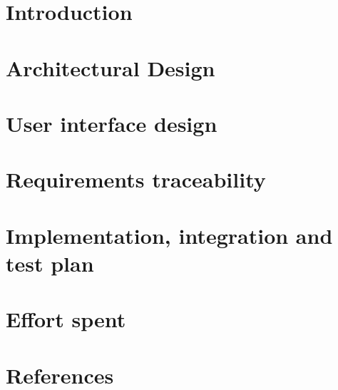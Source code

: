\documentclass{Configuration_Files/PoliMi3i_thesis}
\begin{document}

\chapter{Introduction}


\chapter{Architectural Design}


\chapter{User interface design}


\chapter{Requirements traceability}


\chapter{Implementation, integration and test plan}


\chapter{Effort spent}


\chapter{References}


\cleardoublepage
\end{document}
